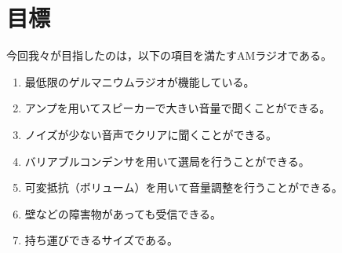 \documentclass[report.tex]{subfiles}
\begin{document}
\section{目標}

今回我々が目指したのは，以下の項目を満たすAMラジオである。

\begin{enumerate}
  \item 最低限のゲルマニウムラジオが機能している。
  \item アンプを用いてスピーカーで大きい音量で聞くことができる。
  \item ノイズが少ない音声でクリアに聞くことができる。
  \item バリアブルコンデンサを用いて選局を行うことができる。
  \item 可変抵抗（ボリューム）を用いて音量調整を行うことができる。
  \item 壁などの障害物があっても受信できる。
  \item 持ち運びできるサイズである。
\end{enumerate}
\end{document}
